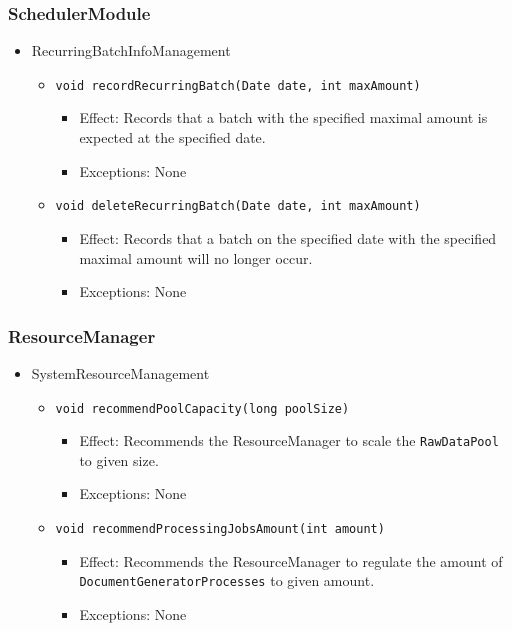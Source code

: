 \documentclass[a4paper,10pt]{article}
\begin{document}
\subsubsection*{SchedulerModule}
\begin{itemize}
	\item RecurringBatchInfoManagement
	\begin{itemize}
		\item \texttt{void recordRecurringBatch(Date date, int maxAmount)}
		\begin{itemize}
			\item Effect: Records that a batch with the specified maximal amount is expected at the specified date.
			\item Exceptions: None
		\end{itemize}
		
		\item \texttt{void deleteRecurringBatch(Date date, int maxAmount)}
		\begin{itemize}
			\item Effect: Records that a batch on the specified date with the specified maximal amount will no longer occur.
			\item Exceptions: None
		\end{itemize}
	\end{itemize}
\end{itemize}

\subsubsection*{ResourceManager}
\begin{itemize}
    \item SystemResourceManagement
    \begin{itemize}
        \item \texttt{void recommendPoolCapacity(long poolSize)}
        \begin{itemize}
            \item Effect: Recommends the ResourceManager to scale the \texttt{Raw\-Data\-Pool} to given size.
            \item Exceptions: None
        \end{itemize}

        \item \texttt{void recommendProcessingJobsAmount(int amount)}
        \begin{itemize}
            \item Effect: Recommends the ResourceManager to regulate the amount of \texttt{DocumentGeneratorProcesses} to given amount.
            \item Exceptions: None
         \end{itemize}
    \end{itemize}
\end{itemize}
\end{document}
